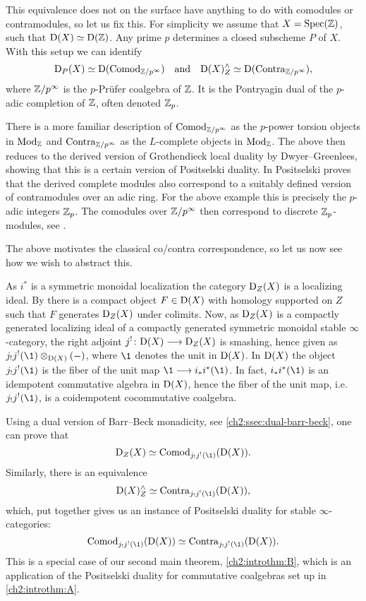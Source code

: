 This equivalence does not on the surface have anything to do with comodules or contramodules, so let us fix this. For simplicity we assume that $X = \operatorname{Spec}(\mathbb{Z})$, such that $\mathrm{D}(X)\simeq \mathrm{D}(\mathbb{Z})$. Any prime $p$ determines a closed subscheme $P$ of $X$. With this setup we can identify 
\[\mathrm{D}_P(X) \simeq \mathrm{D}(\mathrm{Comod}_{\mathbb{Z}/p^\infty}) \quad\text{and}\quad\mathrm{D}(X)^\wedge_Z\simeq \mathrm{D}(\mathrm{Contra}_{\mathbb{Z}/p^\infty}),\] 
where $\mathbb{Z}/p^\infty$ is the $p$-Prüfer coalgebra of $\mathbb{Z}$. It is the Pontryagin dual of the $p$-adic completion of $\mathbb{Z}$, often denoted $\mathbb{Z}_p$. 

\begin{introrm}
    There is a more familiar description of $\mathrm{Comod}_{\mathbb{Z}/p^\infty}$ as the $p$-power torsion objects in $\mathrm{Mod}_{\mathbb{Z}}$ and $\mathrm{Contra}_{\mathbb{Z}/p^\infty}$ as the $L$-complete objects in $\mathrm{Mod}_{\mathbb{Z}}$. The above then reduces to the derived version of Grothendieck local duality by Dwyer--Greenlees, showing that this is a certain version of Positselski duality. In \cite[2.2(1), 2.2(3)]{positselski_2017_abelian} Positselski proves that the derived complete modules also correspond to a suitably defined version of contramodules over an adic ring. For the above example this is precisely the $p$-adic integers $\mathbb{Z}_p$. The comodules over $\mathbb{Z}/p^\infty$ then correspond to discrete $\mathbb{Z}_p$-modules, see \cite[Sec. 1.9, Sec. 1.10]{positselski_2022_contramodules}. 
\end{introrm}


The above motivates the classical co/contra correspondence, so let us now see how we wish to abstract this.  

As $i^*$ is a symmetric monoidal localization the category $\mathrm{D}_Z(X)$ is a localizing ideal. By \cite[6.8]{rouquier_2008} there is a compact object $F\in \mathrm{D}(X)$ with homology supported on $Z$ such that $F$ generates $\mathrm{D}_Z(X)$ under colimits. Now, as $\mathrm{D}_Z(X)$ is a compactly generated localizing ideal of a compactly generated symmetric monoidal stable $\infty$-category, the right adjoint $j^!\colon \mathrm{D}(X)\longrightarrow \mathrm{D}_Z(X)$ is smashing, hence given as $j_! j^!(\1)\otimes_{\Der(X)} (-)$, where $\1$ denotes the unit in $\mathrm{D}(X)$. In $\mathrm{D}(X)$ the object $j_! j^! (\1)$ is the fiber of the unit map $\1\to i_* i^* (\1)$. In fact, $i_* i^* (\1)$ is an idempotent commutative algebra in $\mathrm{D}(X)$, hence the fiber of the unit map, i.e. $j_! j^!(\1)$, is a coidempotent cocommutative coalgebra. 

Using a dual version of Barr--Beck monadicity, see \cref{ch2:ssec:dual-barr-beck}, one can prove that 
\[\Der_Z(X)\simeq \Comod_{j_! j^! (\1)}(\Der(X)).\] 
Similarly, there is an equivalence 
\[\Der(X)^\wedge_Z \simeq \Contra_{j_! j^! (\1)}(\Der(X)),\]
which, put together gives us an instance of Positselski duality for stable $\infty$-categories:
\[\Comod_{j_! j^! (\1)}(\Der(X)) \simeq \Contra_{j_! j^! (\1)}(\Der(X)).\]
This is a special case of our second main theorem, \cref{ch2:introthm:B}, which is an application of the Positselski duality for commutative coalgebras  set up in \cref{ch2:introthm:A}. 
 

